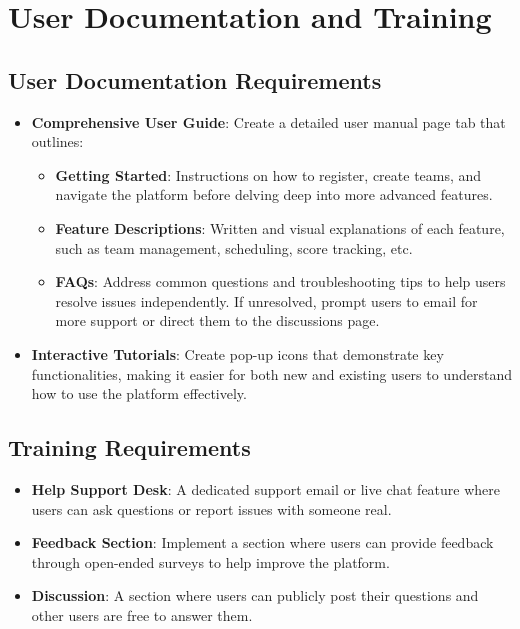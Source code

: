 \documentclass[12pt]{article}
\begin{document}
\section{User Documentation and Training}
\subsection{User Documentation Requirements}
\begin{itemize}
    \item \textbf{Comprehensive User Guide}: Create a detailed user manual page tab that outlines:
    \begin{itemize}
        \item \textbf{Getting Started}: Instructions on how to register, create teams, and navigate the platform before delving deep into more advanced features.
        \item \textbf{Feature Descriptions}: Written and visual explanations of each feature, such as team management, scheduling, score tracking, etc.
        \item \textbf{FAQs}: Address common questions and troubleshooting tips to help users resolve issues independently. If unresolved, prompt users to email for more support or direct them to the discussions page.
    \end{itemize}
    \item \textbf{Interactive Tutorials}: Create pop-up icons that demonstrate key functionalities, making it easier for both new and existing users to understand how to use the platform effectively.
\end{itemize}

\subsection{Training Requirements}
\begin{itemize}
    \item \textbf{Help Support Desk}: A dedicated support email or live chat feature where users can ask questions or report issues with someone real.
    \item \textbf{Feedback Section}: Implement a section where users can provide feedback through open-ended surveys to help improve the platform.
    \item \textbf{Discussion}: A section where users can publicly post their questions and other users are free to answer them.
\end{itemize}
\end{document}
